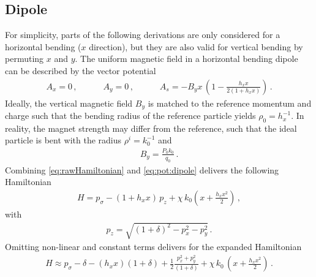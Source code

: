 \subsection{Dipole} \label{chap:dipoleH}
For simplicity, parts of the following derivations are only considered for a horizontal bending ($x$ direction), but they are also valid for vertical bending by permuting $x$ and $y$. The uniform magnetic field in a horizontal bending dipole can be described by the vector potential~\cite{wolski2014beam}
\begin{align}
A_x = 0 \, , \quad \quad \quad A_y =0 \, , \quad \quad \quad A_s = -B_y x \, \left( 1- \frac{h_x x}{2 (1+h_x x)} \right)\, . \label{eq:pot:dipole}
\end{align}
Ideally, the vertical magnetic field $B_y$ is matched to the reference momentum and charge such that the bending radius of the reference particle yields $\rho_0=h_x^{-1}$. In reality, the magnet strength may differ from the reference, such that the ideal particle is bent with the radius $\rho^i=k_0^{-1}$ and 
\begin{align}
B_y = \frac{P_0 k_0}{q_0} \,  .
\end{align}
Combining \eqref{eq:rawHamiltonian} and \eqref{eq:pot:dipole} delivers the following Hamiltonian
\begin{align}
H = p_\sigma - (1+h_x x)\, p_z + \chi \, k_0 \left( x + \frac{h_x x^2}{2} \right) \, ,
\end{align}
%
with
%
\begin{align}
  p_z = \sqrt{(1+\delta)^2 - p_x^2 -p_y ^2} \, .
\end{align}
%
Omitting non-linear and constant terms delivers for the expanded Hamiltonian 
\begin{align}
H \approx p_\sigma - \delta - (h_x x) (1+\delta) + \frac{1}{2} \frac{p_x^2 + p_y^2}{(1+\delta)} + \chi \, k_0 \, \left(x + \frac{h_x x^2}{2}\right) \, . \label{eq:exp_dipole}
\end{align}
%
%
